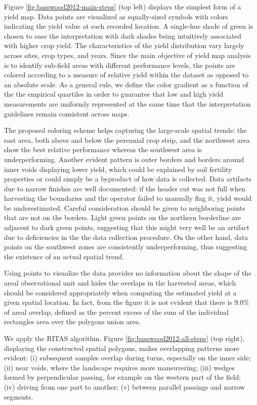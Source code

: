\documentclass[12pt]{article}
\begin{document}
Figure \ref{fig:basswood2012-main-steps}
(top left) displays the simplest form of a yield map. Data points are
visualized as equally-sized symbols with colors indicating the yield
value at each recorded location. A single-hue shade of green is chosen
to ease the interpretation with dark shades being intuitively
associated with higher crop yield. The characteristics of the yield
distribution vary largely across sites, crop types, and years. Since
the main objective of yield map analysis is to identify sub-field
areas with different performance levels, the points are colored
according to a measure of relative yield within the dataset as opposed
to an absolute scale. As a general rule, we define the color gradient
as a function of the the empirical quartiles in order to guarantee
that low and high yield measurements are uniformly represented at the
same time that the interpretation guidelines remain consistent across
maps.

The proposed coloring scheme helps
capturing the large-scale spatial trends: the east area, both above
and below the perennial crop strip, and the northwest area show the
best relative performance whereas the southwest area is
underperforming. Another evident pattern is outer borders and borders
around inner voids displaying lower yield, which could be explained by
soil fertility properties or could simply be a byproduct of how data
is collected. Data artifacts due to narrow finishes are well
documented: if the header cut was not full when harvesting the
boundaries and the operator failed to manually flag it, yield would be
underestimated. Careful consideration should be given to neighboring
points that are not on the borders. Light green points on the northern
borderline are adjacent to dark green points, suggesting that this
might very well be an artifact due to deficiencies in the the data
collection procedure. On the other hand, data points on the southwest
zones are consistently underperforming, thus suggesting the existence
of an actual spatial trend.

Using points to visualize the data
provides no information about the shape of the areal observational
unit and hides the overlaps in the harvested areas, which should be
considered appropriately when computing the estimated yield at a given
spatial location. In fact, from the figure it is not evident that
there is 9.0\% of areal overlap, defined as the percent excess of the
sum of the individual rectangles area over the polygons union area.

We apply the RITAS algorithm. Figure
\ref{fig:basswood2012-all-steps} (top right), displaying the
constructed spatial polygons, makes overlapping patterns more evident:
(i) subsequent samples overlap during turns, especially on the inner
side; (ii) near voids, where the landscape requires more maneuvering;
(iii) wedges formed by perpendicular passing, for example on the
western part of the field; (iv) driving from one part to another; (v)
between parallel passings and narrow segments.
\end{document}
